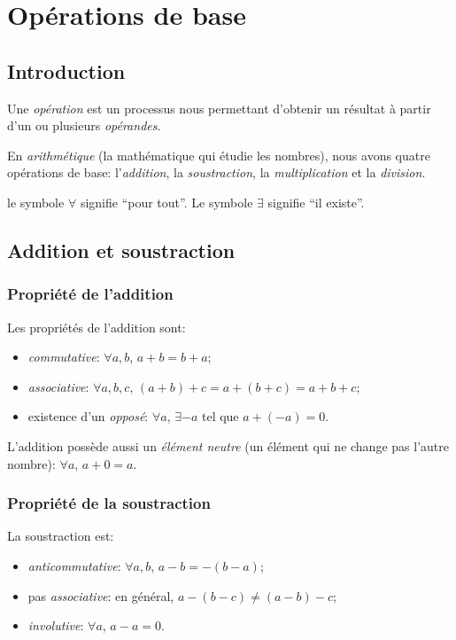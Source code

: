 \chapter{Opérations de base}

\section{Introduction}

\begin{definition}
    Une \emph{opération} est un processus nous permettant d'obtenir un résultat à partir d'un ou plusieurs \emph{opérandes}.
\end{definition}

\noindent En \emph{arithmétique} (la mathématique qui étudie les nombres), nous avons quatre opérations de base: l'\emph{addition}, la \emph{soustraction}, la \emph{multiplication} et la \emph{division}.

 le symbole $\forall$ signifie ``pour tout''. Le symbole $\exists$ signifie ``il existe''.

\section{Addition et soustraction}

\subsection{Propriété de l'addition}

Les propriétés de l'addition sont:
\begin{itemize}
    \item \emph{commutative}: $\forall a,b$, $a+b = b+a$;
    \item \emph{associative}: $\forall a,b,c$, $(a+b)+c = a+(b+c) = a+b+c$;
    \item existence d'un \emph{opposé}: $\forall a$, $\exists -a$ tel que $a + (-a) = 0$.
\end{itemize}

\noindent L'addition possède aussi un \emph{élément neutre} (un élément qui ne change pas l'autre nombre): $\forall a$, $a + 0 = a$.


\subsection{Propriété de la soustraction}

La soustraction est:
\begin{itemize}
    \item \emph{anticommutative}: $\forall a,b$, $a - b = -(b -a)$;
    \item pas \emph{associative}: en général, $a-(b-c) \not= (a-b) - c$;
    \item \emph{involutive}: $\forall a$, $a-a = 0$.
\end{itemize}

